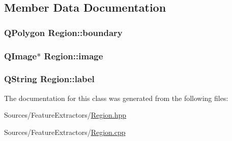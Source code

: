 \subsection{Member Data Documentation}
\hypertarget{class_region_a4a59ef37013f3a6515a79317b0f0b4c0}{
\subsubsection[{boundary}]{\setlength{\rightskip}{0pt plus 5cm}Q\+Polygon Region\+::boundary\hspace{0.3cm}{\ttfamily [private]}}}\label{class_region_a4a59ef37013f3a6515a79317b0f0b4c0}
\hypertarget{class_region_a090b8bc9a8c73f8f874d8d439a0843be}{
\subsubsection[{image}]{\setlength{\rightskip}{0pt plus 5cm}Q\+Image$\ast$ Region\+::image\hspace{0.3cm}{\ttfamily [private]}}}\label{class_region_a090b8bc9a8c73f8f874d8d439a0843be}
\hypertarget{class_region_afcc063386e02be883d71eaf5bcef2a55}{
\subsubsection[{label}]{\setlength{\rightskip}{0pt plus 5cm}Q\+String Region\+::label\hspace{0.3cm}{\ttfamily [private]}}}\label{class_region_afcc063386e02be883d71eaf5bcef2a55}


The documentation for this class was generated from the following files\+:\begin{DoxyCompactItemize}
\item 
Sources/\+Feature\+Extractors/\hyperlink{_region_8hpp}{Region.\+hpp}\item 
Sources/\+Feature\+Extractors/\hyperlink{_region_8cpp}{Region.\+cpp}\end{DoxyCompactItemize}
